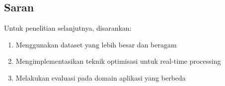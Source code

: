 \documentclass[11pt,a4paper]{article}
\begin{document}
\subsection{Saran}
Untuk penelitian selanjutnya, disarankan:
\begin{enumerate}
    \item Menggunakan dataset yang lebih besar dan beragam
    \item Mengimplementasikan teknik optimisasi untuk real-time processing
    \item Melakukan evaluasi pada domain aplikasi yang berbeda
\end{enumerate}

\newpage
\printbibliography[title=DAFTAR PUSTAKA]
\end{document}
